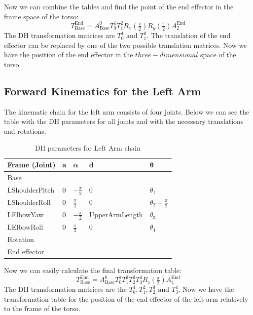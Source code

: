Now we can combine the tables and find the point of the end effector in the frame space of the torso:
\[
T^\text{End}_\text{Base} = A^0_\text{Base}T^1_0T^2_1R_x(\tfrac{\pi}{2})R_y(\tfrac{\pi}{2})A^\text{End}_{2}
\]
The DH transformation matrices are \(T^1_0\text{ and }T^2_1\). The translation of the end effector can be replaced by one of the two possible translation matrices. Now we have the position of the end effector in the \(three-dimensional\) space of the torso.

\subsection{Forward Kinematics for the Left Arm}
The kinematic chain for the left arm consists of four joints. Below we can see the table with the DH parameters for all joints and with the necessary translations and rotations.
\begin{table}[!h]
\centering
\begin{tabular}{|l|>{\centering\arraybackslash}m{2.55cm}|>{\centering\arraybackslash}m{2.55cm}|>{\centering\arraybackslash}m{2.55cm}|>{\centering\arraybackslash}m{2.55cm}|}
\hline
\textbf{Frame (Joint)} & \(\mathbf{a}\) & \(\boldsymbol{\alpha}\) & \(\mathbf{d}\) & \(\boldsymbol{\theta}\)\\ \hline
Base & \multicolumn{4}{|c|}{\(A(0,\text{\footnotesize{ShoulderOffsetY+ElbowOffsetY}},\text{\footnotesize{ShoulderOffsetZ}})\)} \\ \hline
LShoulderPitch & \(0\) & \(-\frac{\pi}{2}\) & \(0\) & \(\theta_1\) \\ \hline
LShoulderRoll & \(0\) & \(\frac{\pi}{2}\) & \(0\) & \(\theta_2 - \frac{\pi}{2}\) \\ \hline
LElbowYaw & \(0\) & \(-\frac{\pi}{2}\) & \footnotesize{UpperArmLength} & \(\theta_3\) \\ \hline
LElbowRoll & \(0\) & \(\frac{\pi}{2}\) & \(0\) & \(\theta_4\) \\ \hline
Rotation & \multicolumn{4}{c|}{\(R_z(\frac{\pi}{2})\)} \\ \hline
End effector & \multicolumn{4}{c|}{\(A(\text{\footnotesize{HandOffsetX+LowerArmLength}},0,0)\)} \\ \hline
\end{tabular}
\caption{DH parameters for Left Arm chain}
\label{tab:DH parameters for Left Arm chain}
\end{table}
Now we can easily calculate the final transformation table:
\[
T^\text{End}_\text{Base} = A^0_\text{Base}T^1_0T^2_1T^3_2T^4_3R_z(\tfrac{\pi}{2})A^\text{End}_{4}
\]
The DH transformation matrices are the \(T^1_0,T^2_1,T^3_2\text{ and }T^4_3\). Now we have the transformation table for the position of the end effector of the left arm relatively to the frame of the torso.

